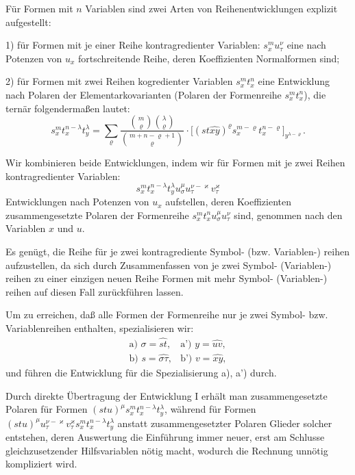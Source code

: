 Für Formen mit $n$ Variablen sind zwei Arten von Reihenentwicklungen explizit aufgestellt:

1) für Formen mit je einer Reihe kontragredienter Variablen: $s_x^m u_\tau^\nu$ eine nach Potenzen von $u_x$ fortschreitende Reihe, deren Koeffizienten \glqq{}Normalformen\grqq{} sind;

2) für Formen mit zwei Reihen kogredienter Variablen $s_x^m t_x^n$ eine Entwicklung nach Polaren der Elementarkovarianten (Polaren der Formenreihe $s_x^m t_x^n$), die ternär folgendermaßen lautet:
\[
\tag{I}
s_x^m t_x^{n-\lambda}t_y^\lambda
=\sum_{\varrho}
\frac{\binom{m}{\varrho}\binom{\lambda}{\varrho}}
 {\binom{m+n-\varrho+1}{\varrho}}\cdot
\bigl[(st\widehat{xy})^\varrho s_x^{m-\varrho}t_x^{n-\varrho}\bigr]_{y^{\lambda-\varrho}}.
\]

Wir kombinieren beide Entwicklungen, indem wir für Formen mit je zwei Reihen kontragredienter Variablen:
\[
s_x^m t_x^{n-\lambda}t_y^\lambda u_\sigma^\mu u_\tau^{\nu-\varkappa}v_\tau^\varkappa
\]
Entwicklungen nach Potenzen von $u_x$ aufstellen, deren Koeffizienten zusammengesetzte Polaren der Formenreihe $s_x^m t_x^n u_\sigma^\mu u_\tau^\nu$ sind, genommen nach den Variablen $x$ und $u$.

Es genügt, die Reihe für je zwei kontragrediente Symbol- (bzw. Variablen-) reihen aufzustellen, da sich durch Zusammenfassen von je zwei Symbol- (Variablen-) reihen zu einer einzigen neuen Reihe Formen mit mehr Symbol- (Variablen-) reihen auf diesen Fall zurückführen lassen.

Um zu erreichen, daß alle Formen der Formenreihe nur je zwei Symbol- bzw. Variablenreihen enthalten, spezialisieren wir:
\[
\begin{array}{ll}
\text{a) } \sigma=\widehat{st}, & \text{a') } y=\widehat{uv},\\[0.3em]
\text{b) } s=\widehat{\sigma\tau}, & \text{b') } v=\widehat{xy},
\end{array}
\]
und führen die Entwicklung für die Spezialisierung a), a') durch.

Durch direkte Übertragung der Entwicklung I erhält man zusammengesetzte Polaren für Formen $(stu)^\mu s_x^m t_x^{n-\lambda}t_y^\lambda$, während für Formen $(stu)^\mu u_\tau^{\nu-\varkappa}v_\tau^\varkappa s_x^m t_x^{n-\lambda}t_y^\lambda$ anstatt zusammengesetzter Polaren Glieder solcher entstehen, deren Auswertung die Einführung immer neuer, erst am Schlusse gleichzusetzender Hilfsvariablen nötig macht, wodurch die Rechnung unnötig kompliziert wird.


